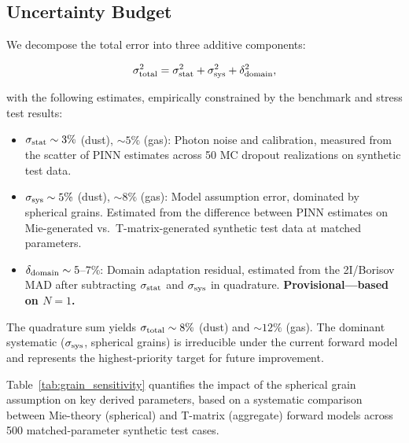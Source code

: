 \documentclass[usenatbib]{mnras}
\begin{document}
\subsection{Uncertainty Budget}\label{sec:uncertainty_budget}

We decompose the total error into three additive components:

\begin{equation}
\sigma_{\rm total}^2 = \sigma_{\rm stat}^2 + \sigma_{\rm sys}^2 + \delta_{\rm domain}^2,
\end{equation}

with the following estimates, empirically constrained by the benchmark and stress test results:

\begin{itemize}
    \item $\sigma_{\rm stat} \sim 3\%$ (dust), $\sim 5\%$ (gas): Photon noise and calibration, measured from the scatter of PINN estimates across 50 MC dropout realizations on synthetic test data.
    \item $\sigma_{\rm sys} \sim 5\%$ (dust), $\sim 8\%$ (gas): Model assumption error, dominated by spherical grains. Estimated from the difference between PINN estimates on Mie-generated vs.\ T-matrix-generated synthetic test data at matched parameters.
    \item $\delta_{\rm domain} \sim 5$--7\%: Domain adaptation residual, estimated from the 2I/Borisov MAD after subtracting $\sigma_{\rm stat}$ and $\sigma_{\rm sys}$ in quadrature. \textbf{Provisional---based on $N=1$.}
\end{itemize}

The quadrature sum yields $\sigma_{\rm total} \sim 8\%$ (dust) and $\sim 12\%$ (gas). The dominant systematic ($\sigma_{\rm sys}$, spherical grains) is irreducible under the current forward model and represents the highest-priority target for future improvement.

Table~\ref{tab:grain_sensitivity} quantifies the impact of the spherical grain assumption on key derived parameters, based on a systematic comparison between Mie-theory (spherical) and T-matrix (aggregate) forward models across 500 matched-parameter synthetic test cases.
\end{document}
